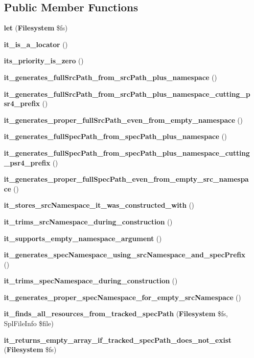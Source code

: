 \subsection*{Public Member Functions}
\begin{DoxyCompactItemize}
\item 
{\bf let} ({\bf Filesystem} \$fs)
\item 
{\bf it\+\_\+is\+\_\+a\+\_\+locator} ()
\item 
{\bf its\+\_\+priority\+\_\+is\+\_\+zero} ()
\item 
{\bf it\+\_\+generates\+\_\+full\+Src\+Path\+\_\+from\+\_\+src\+Path\+\_\+plus\+\_\+namespace} ()
\item 
{\bf it\+\_\+generates\+\_\+full\+Src\+Path\+\_\+from\+\_\+src\+Path\+\_\+plus\+\_\+namespace\+\_\+cutting\+\_\+psr4\+\_\+prefix} ()
\item 
{\bf it\+\_\+generates\+\_\+proper\+\_\+full\+Src\+Path\+\_\+even\+\_\+from\+\_\+empty\+\_\+namespace} ()
\item 
{\bf it\+\_\+generates\+\_\+full\+Spec\+Path\+\_\+from\+\_\+spec\+Path\+\_\+plus\+\_\+namespace} ()
\item 
{\bf it\+\_\+generates\+\_\+full\+Spec\+Path\+\_\+from\+\_\+spec\+Path\+\_\+plus\+\_\+namespace\+\_\+cutting\+\_\+psr4\+\_\+prefix} ()
\item 
{\bf it\+\_\+generates\+\_\+proper\+\_\+full\+Spec\+Path\+\_\+even\+\_\+from\+\_\+empty\+\_\+src\+\_\+namespace} ()
\item 
{\bf it\+\_\+stores\+\_\+src\+Namespace\+\_\+it\+\_\+was\+\_\+constructed\+\_\+with} ()
\item 
{\bf it\+\_\+trims\+\_\+src\+Namespace\+\_\+during\+\_\+construction} ()
\item 
{\bf it\+\_\+supports\+\_\+empty\+\_\+namespace\+\_\+argument} ()
\item 
{\bf it\+\_\+generates\+\_\+spec\+Namespace\+\_\+using\+\_\+src\+Namespace\+\_\+and\+\_\+spec\+Prefix} ()
\item 
{\bf it\+\_\+trims\+\_\+spec\+Namespace\+\_\+during\+\_\+construction} ()
\item 
{\bf it\+\_\+generates\+\_\+proper\+\_\+spec\+Namespace\+\_\+for\+\_\+empty\+\_\+src\+Namespace} ()
\item 
{\bf it\+\_\+finds\+\_\+all\+\_\+resources\+\_\+from\+\_\+tracked\+\_\+spec\+Path} ({\bf Filesystem} \$fs, Spl\+File\+Info \$file)
\item 
{\bf it\+\_\+returns\+\_\+empty\+\_\+array\+\_\+if\+\_\+tracked\+\_\+spec\+Path\+\_\+does\+\_\+not\+\_\+exist} ({\bf Filesystem} \$fs)

\end{DoxyCompactItemize}
